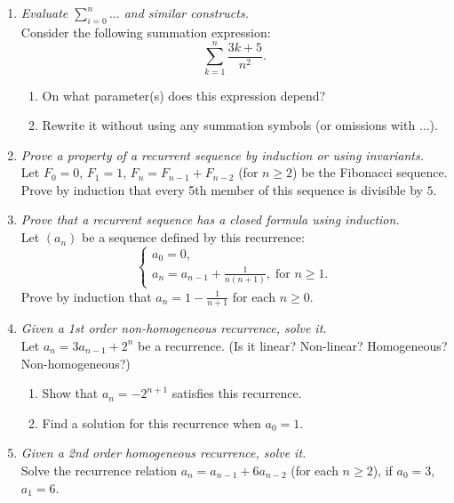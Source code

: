 \documentclass[a4paper,12pt]{article}
\begin{document}
\begin{enumerate}
\item {\small \em Evaluate $\sum\limits_{i=0}^n \ldots$ and similar constructs.}\\
Consider the following summation expression:
\[ \sum\limits_{k=1}^n \frac{3k + 5}{n^2}. \]
\begin{enumerate}
\item On what parameter(s) does this expression depend?
\item Rewrite it without using any summation symbols (or omissions with $\ldots$).
\end{enumerate}



\item {\small \em Prove a property of a recurrent sequence by induction or using invariants.}\\
Let $F_0 = 0$, $F_1 = 1$, $F_n = F_{n-1} + F_{n-2}$ (for $n \geq 2$) be the Fibonacci sequence.
Prove by induction that every 5th member of this sequence is divisible by $5$.

\item {\small \em Prove that a recurrent sequence has a closed formula using induction.}\\
Let $(a_n)$ be a sequence defined by this recurrence:
\[ \left\{ \begin{array}{l}
a_0 = 0,\\
a_{n} = a_{n-1} + \frac{1}{n(n+1)},\;\mbox{for $n \geq 1$}.
\end{array} \right. \]
Prove by induction that $a_n = 1 - \frac{1}{n+1}$ for each $n \geq 0$.



\item {\small \em Given a 1st order non-homogeneous recurrence, solve it.}\\
Let $a_n = 3a_{n-1} +2^n$ be a recurrence. (Is it linear? Non-linear? Homogeneous? Non-homogeneous?)
\begin{enumerate}
\item Show that $a_n = -2^{n+1}$ satisfies this recurrence.
\item Find a solution for this recurrence when $a_0 = 1$.
\end{enumerate}


\item {\small \em Given a 2nd order homogeneous recurrence, solve it.}\\
Solve the recurrence relation $a_n = a_{n-1} + 6a_{n-2}$ (for each $n \geq 2$), if $a_0 = 3$, $a_1 = 6$.



\end{enumerate}
\end{document}

